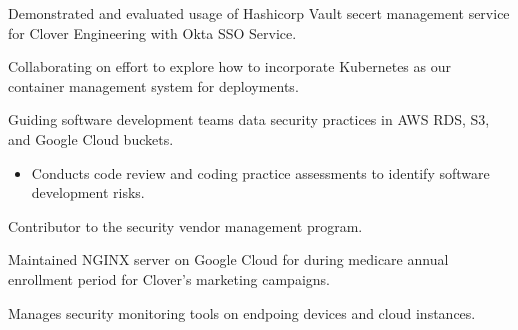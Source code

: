 \documentclass{clinton-resume} %
\begin{document}
\begin{minipage}[t]{0.66\textwidth}

\vspace{\topsep} %
\begin{tightitemize}
\item Demonstrated and evaluated usage of Hashicorp Vault secert management service for Clover Engineering with Okta SSO Service. 
\item Collaborating on effort to explore how to incorporate Kubernetes as our container management system for deployments.
\item Guiding software development teams data security practices in AWS RDS, S3, and Google Cloud buckets. 
    \begin{itemize} 
        \item Conducts code review and coding practice assessments to identify software development risks.
    \end{itemize}
\item Contributor to the security vendor management program.
\item Maintained NGINX server on Google Cloud for during medicare annual enrollment period for Clover's marketing campaigns.
\item Manages security monitoring tools on endpoing devices and cloud instances.

\end{tightitemize}








\end{minipage}
\end{document}

